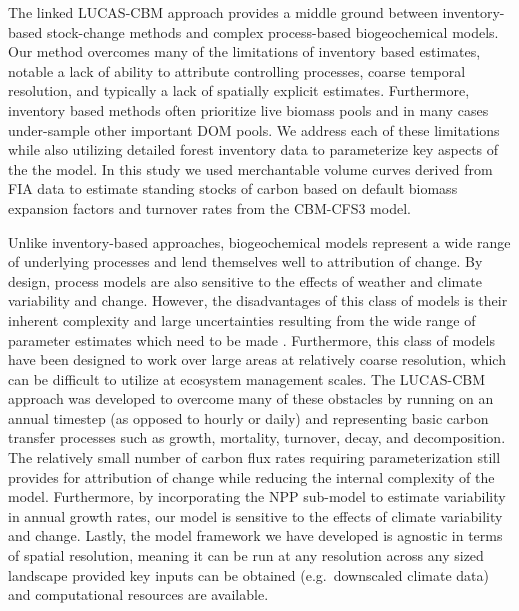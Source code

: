\documentclass[
]{book}
\begin{document}
The linked LUCAS-CBM approach provides a middle ground between inventory-based stock-change methods and complex process-based biogeochemical models. Our method overcomes many of the limitations of inventory based estimates, notable a lack of ability to attribute controlling processes, coarse temporal resolution, and typically a lack of spatially explicit estimates. Furthermore, inventory based methods often prioritize live biomass pools and in many cases under-sample other important DOM pools. We address each of these limitations while also utilizing detailed forest inventory data to parameterize key aspects of the the model. In this study we used merchantable volume curves derived from FIA data \citep{bechtold2005enhanced} to estimate standing stocks of carbon based on default biomass expansion factors and turnover rates from the CBM-CFS3 model.

Unlike inventory-based approaches, biogeochemical models represent a wide range of underlying processes and lend themselves well to attribution of change. By design, process models are also sensitive to the effects of weather and climate variability and change. However, the disadvantages of this class of models is their inherent complexity and large uncertainties resulting from the wide range of parameter estimates which need to be made \citep{hayes2012reconciling}. Furthermore, this class of models have been designed to work over large areas at relatively coarse resolution, which can be difficult to utilize at ecosystem management scales. The LUCAS-CBM approach was developed to overcome many of these obstacles by running on an annual timestep (as opposed to hourly or daily) and representing basic carbon transfer processes such as growth, mortality, turnover, decay, and decomposition. The relatively small number of carbon flux rates requiring parameterization still provides for attribution of change while reducing the internal complexity of the model. Furthermore, by incorporating the NPP sub-model to estimate variability in annual growth rates, our model is sensitive to the effects of climate variability and change. Lastly, the model framework we have developed is agnostic in terms of spatial resolution, meaning it can be run at any resolution across any sized landscape provided key inputs can be obtained (e.g.~downscaled climate data) and computational resources are available.
\end{document}
